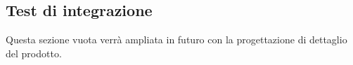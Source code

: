 \subsection{Test di integrazione}
Questa sezione vuota verrà ampliata in futuro con la progettazione di dettaglio del prodotto.

